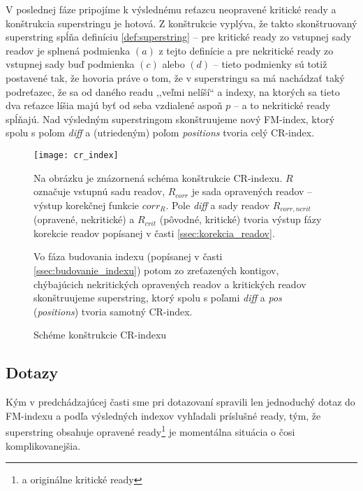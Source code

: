 V poslednej fáze pripojíme k výslednému reťazcu neopravené kritické ready a konštrukcia superstringu je hotová. Z konštrukcie vyplýva, že takto skonštruovaný superstring spĺňa definíciu \ref{def:superstring} -- pre kritické ready zo vstupnej sady readov je splnená podmienka $(a)$ z tejto definície a pre nekritické ready zo vstupnej sady buď podmienka $(c)$ alebo $(d)$ -- tieto podmienky sú totiž postavené tak, že hovoria práve o tom, že v superstringu sa má nachádzať taký podreťazec, že sa od daného readu ,,veľmi nelíší`` a indexy, na ktorých sa tieto dva reťazce líšia majú byť od seba vzdialené aspoň $p$ -- a to nekritické ready spĺňajú. Nad výsledným superstringom skonštruujeme nový FM-index, ktorý spolu s poľom \emph{diff} a (utriedeným) poľom \emph{positions} tvoria celý CR-index.

\begin{figure}[ht]
    \begin{minipage}[t]{0.45\linewidth}
        \vspace{0pt}
        \centering
        \texttt{[image: cr\_index]}
        \caption{Schéme konštrukcie CR-indexu}
        \label{fig:cr_index}
    \end{minipage}
    \hspace{0.5cm}
    \begin{minipage}[t]{0.45\linewidth}
        \vspace{50pt}
        Na obrázku je znázornená schéma konštrukcie CR-indexu. $R$ označuje vstupnú sadu readov, $R_{corr}$ je sada opravených readov -- výstup korekčnej funkcie $corr_R$. Pole \emph{diff} a sady readov $R_{corr,ncrit}$ (opravené, nekritické) a $R_{crit}$ (pôvodné, kritické) tvoria výstup fázy korekcie readov popísanej v časti \ref{ssec:korekcia_readov}.
        
        Vo fáza budovania indexu (popísanej v časti \ref{ssec:budovanie_indexu}) potom zo zreťazených kontigov, chýbajúcich nekritických opravených readov a kritických readov skonštruujeme superstring, ktorý spolu s poľami \emph{diff} a \emph{pos} (\emph{positions}) tvoria samotný CR-index.
    \end{minipage}
\end{figure}
\newpage
\subsection{Dotazy}
Kým v predchádzajúcej časti sme pri dotazovaní spravili len jednoduchý dotaz do FM-indexu a podľa výsledných indexov vyhľadali príslušné ready, tým, že superstring obsahuje opravené ready\footnote{a originálne kritické ready} je momentálna situácia o čosi komplikovanejšia.

